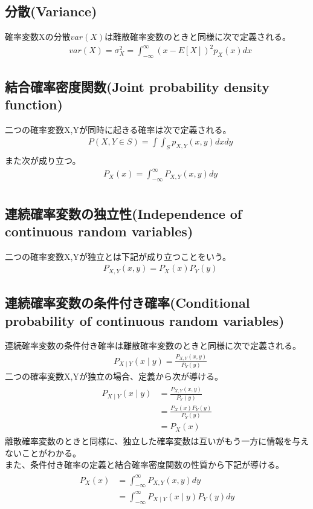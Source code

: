 \documentclass[a4j]{jarticle}
\begin{document}
\subsection{分散(Variance)}
確率変数Xの分散$var(X)$は離散確率変数のときと同様に次で定義される。
\begin{align}
    &var(X)=\sigma_{X}^2=\int_{-\infty}^{\infty}(x - E[X])^2p_{X}(x)dx
\end{align}


\subsection{結合確率密度関数(Joint probability density function)}
二つの確率変数X,Yが同時に起きる確率は次で定義される。
\begin{align}
    &P(X,Y \in S)=\int\int_{S}p_{X,Y}(x,y)dxdy \\
\end{align}
また次が成り立つ。
\begin{align}
    &P_{X}(x)=\int_{-\infty}^{\infty}P_{X,Y}(x,y)dy \\
\end{align}


\subsection{連続確率変数の独立性(Independence of continuous random variables)}
二つの確率変数X,Yが独立とは下記が成り立つことをいう。
\begin{align}
    &P_{X,Y}(x,y)=P_{X}(x)P_{Y}(y)
\end{align}


\subsection{連続確率変数の条件付き確率(Conditional probability of continuous random variables)}
連続確率変数の条件付き確率は離散確率変数のときと同様に次で定義される。
\begin{align}
    &P_{X \mid Y}(x \mid y)=\frac{P_{X,Y}(x,y)}{P_{Y}(y)}
\end{align}
二つの確率変数X,Yが独立の場合、定義から次が導ける。
\begin{align}
    \begin{aligned}
     P_{X \mid Y}(x \mid y)&=\frac{P_{X,Y}(x,y)}{P_{Y}(y)} \\
    &=\frac{P_X(x)P_{Y}(y)}{P_{Y}(y)} \\
    &=P_X(x)
    \end{aligned}
\end{align}
離散確率変数のときと同様に、独立した確率変数は互いがもう一方に情報を与えないことがわかる。\\
また、条件付き確率の定義と結合確率密度関数の性質から下記が導ける。
\begin{align}
    \begin{aligned}
    P_{X}(x)&=\int_{-\infty}^{\infty}P_{X,Y}(x,y)dy \\
    &= \int_{-\infty}^{\infty}P_{X \mid Y}(x \mid y)P_{Y}(y)dy \\
    \end{aligned}
\end{align}
\end{document}

